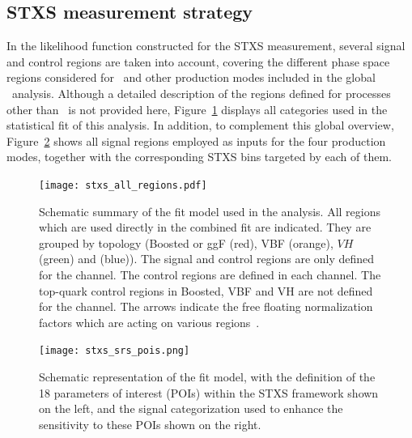 \subsection{STXS measurement strategy}
\label{stxs_setup}

In the likelihood function constructed for the STXS measurement, several signal and control regions are taken into account, 
covering the different phase space regions considered for \ttHtt\ and other production modes included in the global \htautau\ analysis. 
Although a detailed description of the regions defined for processes other than \ttH\ is not provided here, 
Figure~\ref{fig:stxs_all_regions} displays all categories used in the statistical fit of this analysis. 
In addition, to complement this global overview, Figure~\ref{fig:stxs_srs_pois} shows all signal regions employed as inputs for the four production modes, 
together with the corresponding STXS bins targeted by each of them.

\begin{figure}[htbp]
  \centering
  \texttt{[image: stxs\_all\_regions.pdf]}
  \caption{Schematic summary of the fit model used in the analysis. All regions which are used directly in the combined fit are indicated. They are grouped by topology (Boosted or ggF (red), VBF (orange), $VH$ (green) and \ttH (blue)). The \ttH signal and control regions are only defined for the \tauhadhad channel. The \ztautau control regions are defined in each channel. The top-quark control regions in Boosted, VBF and VH are not defined for the \tauhadhad channel. The arrows indicate the free floating normalization factors which are acting on various regions~\cite{differential_htautau}.}
  \label{fig:stxs_all_regions}
\end{figure}

\begin{figure}[htbp]
  \centering
  \texttt{[image: stxs\_srs\_pois.png]}
  \caption{Schematic representation of the fit model, with the definition of the 18 parameters of interest (POIs) within the STXS framework shown on the left, and the signal categorization used to enhance the sensitivity to these POIs shown on the right.}
  \label{fig:stxs_srs_pois}
\end{figure}


